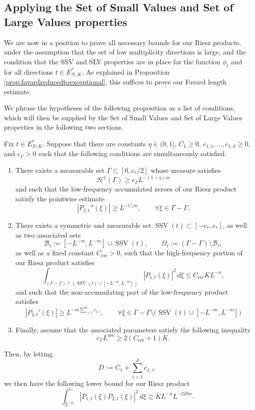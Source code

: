\documentclass[12pt]{amsart}
\numberwithin{equation}{section}
\begin{document}
\subsection{Applying the Set of Small Values and Set of Large Values properties}

We are now in a position to prove all necessary bounds for our Riesz products, under the assumption that the set of low multiplicity directions is large, and the condition that the SSV and SLV properties are in place for the function $\phi_t$ and for all directions $t \in E_{N,K}^*$. As explained in Proposition \ref{prop:favardreducedtoexceptional}, this suffices to prove our Favard length estimate.

We phrase the hypotheses of the following proposition as a list of conditions, which will then be supplied by the Set of Small Values and Set of Large Values properties in the following two sections.

\begin{proposition}
\label{prop:keyproposition}
Fix $t\in E_{N,K}^*$.  Suppose that there are constants
$\eta\in(0,1]$, $C_1\geq0$, $c_{1,1},\ldots,c_{1,d}\geq0$, and
$c_\Gamma>0$ such that the following conditions are simultaneously satisfied.
\begin{enumerate}
\item There exists a measurable set $\Gamma\subset[0,c_*/2]$ whose measure satisfies
$$
\mathcal{H}^1 (\Gamma) \geq c_\Gamma L^{-(1-\eta)m}
$$
and such that the low-frequency accumulated zeroes of our Riesz product satisfy the pointwise estimate
\[
|P_{2,t}''(\xi)|\geq L^{-C_1m},
\qquad
\forall\xi\in\Gamma-\Gamma.
\]
\item There exists a symmetric and measurable set $\operatorname{SSV}(t)\subset[-c_*,c_*]$, as well as two associated sets
\[
\mathcal B_t
:=
[-L^{-m},L^{-m}]
\cup
\operatorname{SSV}(t),
\qquad
\Omega_t
:=
(\Gamma-\Gamma)\setminus\mathcal B_t,
\]
as well as a fixed constant $C_{\mathrm{err}}>0$, such that the high-frequency portion of our Riesz product satisfies
\[
\int_{(\Gamma-\Gamma)\cap (\operatorname{SSV}(t) \cup [-L^{-m}, L^{-m}])}
|P_{1,t}(\xi)|^2\,d\xi
\leq
C_{\mathrm{err}}KL^{-n},
\]
and such that the non-accumulating part of the low-frequency product satisfies
\[
|P_{2,t}'(\xi)|
\geq
L^{-m\sum_{i=1}^dc_{1,i}},
\qquad
\forall\xi\in \Gamma - \Gamma \setminus \big(\operatorname{SSV}(t) \cup [-L^{-m}, L^{-m}]\big)
\]
\item Finally, assume that the associated parameters satisfy the following inequality
\[
c_\Gamma L^{\eta m}
\geq
2(C_{\mathrm{err}}+1)K.
\]
\end{enumerate}

\noindent
Then, by letting
\[
D:=C_1+\sum_{i=1}^dc_{1,i},
\]
we then have the following lower bound for our Riesz product
\begin{equation}
\label{eq:parameterneutralRieszlower}
\int_{L^{-m}}^{c_*}
|P_{1,t}(\xi)P_{2,t}(\xi)|^2\,d\xi
\gtrsim
KL^{-n}L^{-2Dm}.
\end{equation}
\end{proposition}
\end{document}
